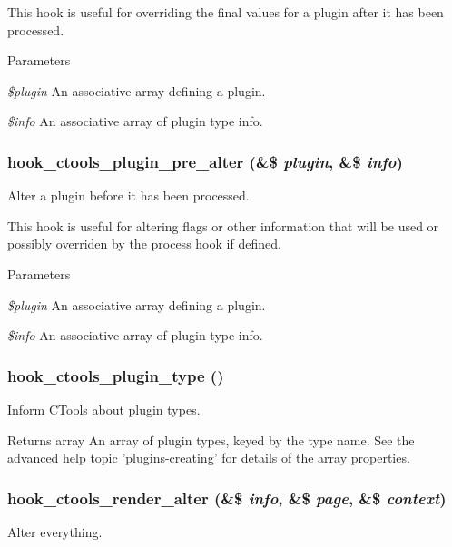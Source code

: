 This hook is useful for overriding the final values for a plugin after it has been processed.


\begin{DoxyParams}{Parameters}
\item[{\em \$plugin}]An associative array defining a plugin. \item[{\em \$info}]An associative array of plugin type info. \end{DoxyParams}
\hypertarget{group__hooks_ga4ae530d112605c111f7bdead789ed91d}{
\subsubsection[{hook\_\-ctools\_\-plugin\_\-pre\_\-alter}]{\setlength{\rightskip}{0pt plus 5cm}hook\_\-ctools\_\-plugin\_\-pre\_\-alter (\&\$ {\em plugin}, \/  \&\$ {\em info})}}
\label{group__hooks_ga4ae530d112605c111f7bdead789ed91d}
Alter a plugin before it has been processed.

This hook is useful for altering flags or other information that will be used or possibly overriden by the process hook if defined.


\begin{DoxyParams}{Parameters}
\item[{\em \$plugin}]An associative array defining a plugin. \item[{\em \$info}]An associative array of plugin type info. \end{DoxyParams}
\hypertarget{group__hooks_gacb27d27849a3374ddda0120603d549ac}{
\subsubsection[{hook\_\-ctools\_\-plugin\_\-type}]{\setlength{\rightskip}{0pt plus 5cm}hook\_\-ctools\_\-plugin\_\-type ()}}
\label{group__hooks_gacb27d27849a3374ddda0120603d549ac}
Inform CTools about plugin types.

\begin{DoxyReturn}{Returns}
array An array of plugin types, keyed by the type name. See the advanced help topic 'plugins-\/creating' for details of the array properties. 
\end{DoxyReturn}
\hypertarget{group__hooks_ga512e53c159fc6ea771d23b52d54b2f6a}{
\subsubsection[{hook\_\-ctools\_\-render\_\-alter}]{\setlength{\rightskip}{0pt plus 5cm}hook\_\-ctools\_\-render\_\-alter (\&\$ {\em info}, \/  \&\$ {\em page}, \/  \&\$ {\em context})}}
\label{group__hooks_ga512e53c159fc6ea771d23b52d54b2f6a}
Alter everything.


